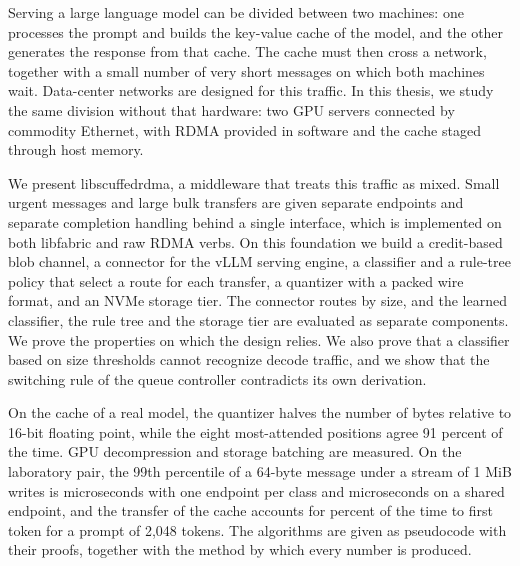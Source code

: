 Serving a large language model can be divided between two machines: one
processes the prompt and builds the key-value cache of the model, and the
other generates the response from that cache. The cache must then cross a
network, together with a small number of very short messages on which both
machines wait. Data-center networks are designed for this traffic. In this
thesis, we study the same division without that hardware: two GPU servers
connected by commodity Ethernet, with RDMA provided in software and the
cache staged through host memory.

We present libscuffedrdma, a middleware that treats this traffic as mixed.
Small urgent messages and large bulk transfers are given separate endpoints
and separate completion handling behind a single interface, which is
implemented on both libfabric and raw RDMA verbs. On this foundation we build
a credit-based blob channel, a connector for the vLLM serving engine, a
classifier and a rule-tree policy that select a route for each transfer, a
quantizer with a packed wire format, and an NVMe storage tier. The connector
routes by size, and the learned classifier, the rule tree and the
storage tier are evaluated as separate components. We prove the
properties on which the design relies. We also prove that a classifier based on size thresholds cannot recognize decode traffic, and we show that the switching rule of the queue controller contradicts its own derivation.

On the cache of a real model, the quantizer halves the number of bytes
relative to 16-bit floating point, while the eight most-attended positions
agree 91 percent of the time. GPU decompression and storage batching are
measured. On the laboratory pair, the 99th percentile of a 64-byte message
under a stream of 1 MiB writes is \blank{} microseconds with one endpoint per
class and \blank{} microseconds on a shared endpoint, and the transfer of the
cache accounts for \blank{} percent of the time to first token for a prompt
of 2,048 tokens.  The algorithms are given as pseudocode with their proofs, together with the method by which every number is produced.
